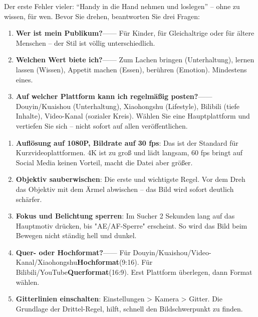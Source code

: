 


Der erste Fehler vieler: “Handy in die Hand nehmen und loslegen” – ohne zu wissen, für wen. Bevor Sie drehen, beantworten Sie drei Fragen:

\begin{enumerate}
  \item \textbf{Wer ist mein Publikum?}—— Für Kinder, für Gleichaltrige oder für ältere Menschen – der Stil ist völlig unterschiedlich.
  \item \textbf{Welchen Wert biete ich?}—— Zum Lachen bringen (Unterhaltung), lernen lassen (Wissen), Appetit machen (Essen), berühren (Emotion). Mindestens eines.
  \item \textbf{Auf welcher Plattform kann ich regelmäßig posten?}—— Douyin/Kuaishou (Unterhaltung), Xiaohongshu (Lifestyle), Bilibili (tiefe Inhalte), Video-Kanal (sozialer Kreis). Wählen Sie eine Hauptplattform und vertiefen Sie sich – nicht sofort auf allen veröffentlichen.
\end{enumerate}


\begin{enumerate}
  \item \textbf{Auflösung auf 1080P, Bildrate auf 30 fps}: Das ist der Standard für Kurzvideoplattformen. 4K ist zu groß und lädt langsam, 60 fps bringt auf Social Media keinen Vorteil, macht die Datei aber größer.
  \item \textbf{Objektiv sauberwischen}: Die erste und wichtigste Regel. Vor dem Dreh das Objektiv mit dem Ärmel abwischen – das Bild wird sofort deutlich schärfer.
  \item \textbf{Fokus und Belichtung sperren}: Im Sucher 2 Sekunden lang auf das Hauptmotiv drücken, bis "AE/AF-Sperre" erscheint. So wird das Bild beim Bewegen nicht ständig hell und dunkel.
  \item \textbf{Quer- oder Hochformat?}—— Für Douyin/Kuaishou/Video-Kanal/Xiaohongshu\textbf{Hochformat}(9:16). Für Bilibili/YouTube\textbf{Querformat}(16:9). Erst Plattform überlegen, dann Format wählen.
  \item \textbf{Gitterlinien einschalten}: Einstellungen > Kamera > Gitter. Die Grundlage der Drittel-Regel, hilft, schnell den Bildschwerpunkt zu finden.
\end{enumerate}

